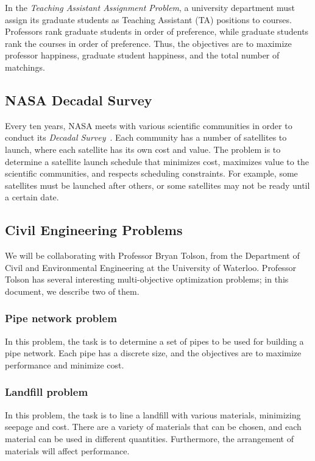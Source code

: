 \documentclass[11pt]{article}
\begin{document}
In the \textit{Teaching Assistant Assignment Problem}, a university
department must assign its graduate students as Teaching Assistant (TA)
positions to courses. Professors rank graduate students in order of
preference, while graduate students rank the courses in order of
preference. Thus, the objectives are to maximize professor happiness,
graduate student happiness, and the total number of matchings.

\subsection{NASA Decadal Survey}

Every ten years, NASA meets with various scientific communities in
order to conduct its \textit{Decadal Survey}~\cite{ref:nasa11}. Each
community has a number of satellites to launch, where each satellite
has its own cost and value. The problem is to determine a satellite
launch schedule that minimizes cost, maximizes value to the scientific
communities, and respects scheduling constraints. For example, some
satellites must be launched after others, or some satellites may not be
ready until a certain date.

\subsection{Civil Engineering Problems}

We will be collaborating with Professor Bryan Tolson, from the
Department of Civil and Environmental Engineering at the University of
Waterloo. Professor Tolson has several interesting multi-objective
optimization problems; in this document, we describe two of them.

\subsubsection{Pipe network problem}

In this problem, the task is to determine a set of pipes to be used for
building a pipe network. Each pipe has a discrete size, and the
objectives are to maximize performance and minimize cost.

\subsubsection{Landfill problem}

In this problem, the task is to line a landfill with various materials,
minimizing seepage and cost. There are a variety of materials that can
be chosen, and each material can be used in different quantities.
Furthermore, the arrangement of materials will affect performance.
\end{document}
